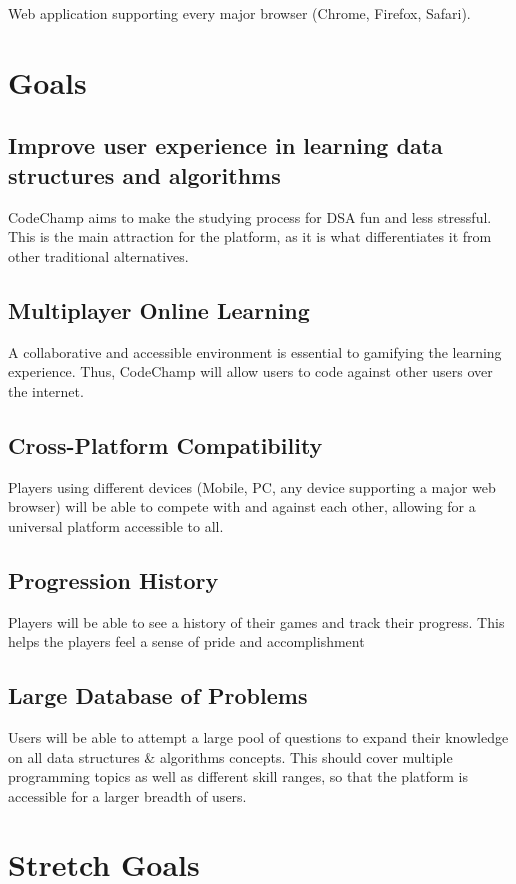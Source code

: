 \documentclass{article}
\begin{document}
Web application supporting every major browser (Chrome, Firefox, Safari).

\section{Goals}
\subsection{Improve user experience in learning data structures and algorithms}
CodeChamp aims to make the studying process for DSA fun and less stressful. This is the main attraction for the platform, as it is what differentiates it from other traditional alternatives.

\subsection{Multiplayer Online Learning}
A collaborative and accessible environment is essential to gamifying the learning experience. Thus, CodeChamp will allow users to code against other users over the internet.

\subsection{Cross-Platform Compatibility}
Players using different devices (Mobile, PC, any device supporting a major web browser) will be able to compete with and against each other, allowing for a universal platform accessible to all.

\subsection{Progression History}
Players will be able to see a history of their games and track their progress. This helps the players feel a sense of pride and accomplishment 

\subsection{Large Database of Problems}
Users will be able to attempt a large pool of questions to expand their knowledge on all data structures \& algorithms concepts. This should cover multiple programming topics as well as different skill ranges, so that the platform is accessible for a larger breadth of users.

\section{Stretch Goals}
\end{document}

